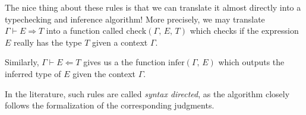 \documentclass{article}
\begin{document}
\begin{definition} 
\begin{enumerate}



  \end{enumerate}
\end{definition}

The nice thing about these rules is that we can translate it almost directly
into a typechecking and inference algorithm!
More precisely, we may translate $\Gamma \vdash E \Rightarrow T$ into a
function called $\text{check}(\Gamma, \, E, \, T)$ which checks if the
expression $E$ really has the type $T$ given a context $\Gamma$.

Similarly, $\Gamma \vdash E \Leftarrow T$ gives us a the function
$\text{infer}(\Gamma, \, E)$ which outputs the inferred type of $E$ given
the context $\Gamma$.

In the literature, such rules are called \textit{syntax directed}, as the
algorithm closely follows the formalization of the corresponding judgments.
\end{document}
